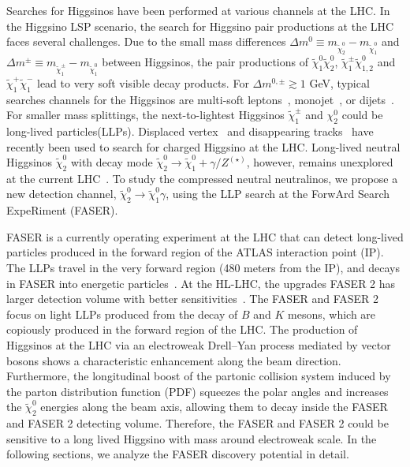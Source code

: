 \documentclass[
    prl,
    twocolumn,
    superscriptaddress,
    nofootinbib,
    amsmath, amssymb,
    aps,
    reprint,
    floatfix
]{revtex4-2}
\newcommand{\Wei}[1]{\textcolor{green2} {Wei: #1}}
\newcommand{\px}[1]{\textcolor{blue} {PX: {\bf Comment:} {\it #1}}}
\begin{document}
Searches for Higgsinos have been performed at various channels at the LHC. 
In the Higgsino LSP scenario, the search for Higgsino pair productions at the LHC faces several challenges. Due to the small mass differences 
$\Delta m^0 \equiv m_{\tilde{\chi}_2^0} - m_{\tilde{\chi}_1^0}$ and
$\Delta m^\pm \equiv m_{\tilde{\chi}_1^\pm} - m_{\tilde{\chi}_1^0}$ 
between Higgsinos, the pair productions of $\tilde{\chi}_1^0 \tilde{\chi}_2^0$, $\tilde{\chi}_1^\pm \tilde{\chi}_{1,2}^0$ and $\tilde{\chi}_1^+ \tilde{\chi}_1^-$ lead to very soft visible decay products. For $\Delta m^{0,\pm} \gtrsim 1$ GeV, typical searches channels for the Higgsinos are  multi-soft leptons~\cite{ATLAS:2021moa, ATLAS:2019lng, CMS:2021edw, CMS-PAS-EXO-23-017}, monojet~\cite{ATLAS:2021kxv, Buanes:2022wgm, CMS:2021far, Agin:2023yoq}, or dijets~\cite{ATLAS:2024woy}.  For smaller mass splittings, the next-to-lightest Higgsinos $\tilde{\chi}_1^{\pm}$ and $\chi_2^0$ could be long-lived particles(LLPs).  Displaced vertex~\cite{ATLAS:2024umc, CMS:2025twk} and disappearing tracks~\cite{ATLAS:2022rme, CMS:2023mny} have recently been used to search for charged Higgsino at the LHC. 
% 
Long-lived neutral Higgsinos $\tilde{\chi}_2^0$ with decay mode $\tilde{\chi}_2^0 \to \tilde{\chi}_1^0 + \gamma/Z^{(\star)}$, however, remains unexplored at the current LHC~\cite{ATLAS:2024woy}.
To study the compressed neutral neutralinos, we propose a new detection channel, $\tilde{\chi}_2^0 \to \tilde{\chi}_1^0 \gamma$, using the LLP search at the ForwArd Search ExpeRiment (FASER). 
 

FASER is a currently operating experiment at the LHC that can detect long-lived particles produced in the forward region of the ATLAS interaction point (IP). 
The LLPs travel in the very forward region (480 meters from the IP),  and decays in FASER into  energetic particles~\cite{Feng:2017uoz,FASER:2018ceo, FASER:2018bac, FASER:2022hcn, FASER:2021ljd,FASER:2021cpr}. 
At the HL-LHC, the upgrades FASER 2 has larger detection volume with better sensitivities~\cite{FASER:2018eoc,Anchordoqui:2021ghd,Feng:2022inv}. 
The FASER and FASER 2 focus on light LLPs produced from the decay of $B$ and $K$ mesons, which are copiously produced in the forward region of the LHC. 
The production of Higgsinos at the LHC  via an electroweak Drell–Yan process mediated by vector bosons shows a characteristic enhancement along the beam direction. Furthermore, the longitudinal boost of the partonic collision system induced by the parton distribution function (PDF) squeezes the polar angles and increases the $\tilde{\chi}_2^0$ energies along the beam axis, allowing them to decay inside the FASER and FASER 2 detecting volume.
Therefore, the FASER and FASER 2 could be sensitive to a long lived Higgsino with mass around electroweak scale. In the following sections, we analyze the FASER discovery potential in detail.
  
\end{document}
